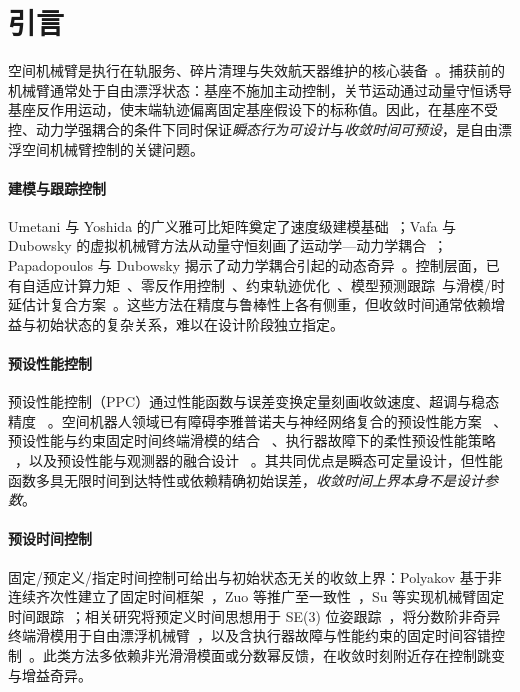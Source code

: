 \section{引言}
\label{sec:intro}

空间机械臂是执行在轨服务、碎片清理与失效航天器维护的核心装备~\cite{liu2021review,yan}。捕获前的机械臂通常处于自由漂浮状态：基座不施加主动控制，关节运动通过动量守恒诱导基座反作用运动，使末端轨迹偏离固定基座假设下的标称值。因此，在基座不受控、动力学强耦合的条件下同时保证\emph{瞬态行为可设计}与\emph{收敛时间可预设}，是自由漂浮空间机械臂控制的关键问题。

\paragraph{建模与跟踪控制}
Umetani 与 Yoshida 的广义雅可比矩阵奠定了速度级建模基础~\cite{umetani1989}；Vafa 与 Dubowsky 的虚拟机械臂方法从动量守恒刻画了运动学—动力学耦合~\cite{vafa1990}；Papadopoulos 与 Dubowsky 揭示了动力学耦合引起的动态奇异~\cite{papadopoulos1993,dubowsky1993}。控制层面，已有自适应计算力矩~\cite{parlaktuna2004}、零反作用控制~\cite{xu2016}、约束轨迹优化~\cite{wang2015}、模型预测跟踪~\cite{ning2019}与滑模/时延估计复合方案~\cite{yu2022}。这些方法在精度与鲁棒性上各有侧重，但收敛时间通常依赖增益与初始状态的复杂关系，难以在设计阶段独立指定。

\paragraph{预设性能控制}
预设性能控制（PPC）通过性能函数与误差变换定量刻画收敛速度、超调与稳态精度 ~\cite{katsoukisLowComplexityRobust2022}。空间机器人领域已有障碍李雅普诺夫与神经网络复合的预设性能方案 ~\cite{yao2021}、预设性能与约束固定时间终端滑模的结合 ~\cite{huConstrainedFixedTimeTerminal2024}、执行器故障下的柔性预设性能策略 ~\cite{liErrorTriggeredFlexiblePrescribed2025}，以及预设性能与观测器的融合设计 ~\cite{chenPrescribedPerformanceObservercontroller2025}。其共同优点是瞬态可定量设计，但性能函数多具无限时间到达特性或依赖精确初始误差，\emph{收敛时间上界本身不是设计参数}。

\paragraph{预设时间控制}
固定/预定义/指定时间控制可给出与初始状态无关的收敛上界：Polyakov 基于非连续齐次性建立了固定时间框架~\cite{polyakov2012}，Zuo 等推广至一致性~\cite{zuo2019}，Su 等实现机械臂固定时间跟踪~\cite{su2020}；相关研究将预定义时间思想用于 SE(3) 位姿跟踪~\cite{xuPredefinedTimeTrackingControl2024}，将分数阶非奇异终端滑模用于自由漂浮机械臂~\cite{dou2025fractional}，以及含执行器故障与性能约束的固定时间容错控制~\cite{li2025}。此类方法多依赖非光滑滑模面或分数幂反馈，在收敛时刻附近存在控制跳变与增益奇异。

